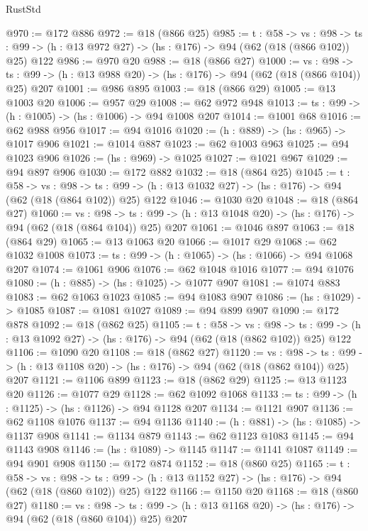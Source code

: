 \begin{lexlean}{RustStd}
\begin{coremodule}
{\begin{coremodule}
{{{{@970 := @172 @886
@972 := @18 (@866 @25)
@985 := {t : @58} ->
  {vs : @98} ->
  {ts : @99} -> (h : @13 @972 @27) -> (hs : @176) -> @94 (@62 (@18 (@866 @102)) @25) @122
@986 := @970 @20
@988 := @18 (@866 @27)
@1000 := {vs : @98} ->
  {ts : @99} -> (h : @13 @988 @20) -> (hs : @176) -> @94 (@62 (@18 (@866 @104)) @25) @207
@1001 := @986 @895
@1003 := @18 (@866 @29)
@1005 := @13 @1003 @20
@1006 := @957 @29
@1008 := @62 @972 @948
@1013 := {ts : @99} -> (h : @1005) -> (hs : @1006) -> @94 @1008 @207
@1014 := @1001 @68
@1016 := @62 @988 @956
@1017 := @94 @1016
@1020 := (h : @889) -> (hs : @965) -> @1017 @906
@1021 := @1014 @887
@1023 := @62 @1003 @963
@1025 := @94 @1023 @906
@1026 := (hs : @969) -> @1025
@1027 := @1021 @967
@1029 := @94 @897 @906
@1030 := @172 @882
@1032 := @18 (@864 @25)
@1045 := {t : @58} ->
  {vs : @98} ->
  {ts : @99} -> (h : @13 @1032 @27) -> (hs : @176) -> @94 (@62 (@18 (@864 @102)) @25) @122
@1046 := @1030 @20
@1048 := @18 (@864 @27)
@1060 := {vs : @98} ->
  {ts : @99} -> (h : @13 @1048 @20) -> (hs : @176) -> @94 (@62 (@18 (@864 @104)) @25) @207
@1061 := @1046 @897
@1063 := @18 (@864 @29)
@1065 := @13 @1063 @20
@1066 := @1017 @29
@1068 := @62 @1032 @1008
@1073 := {ts : @99} -> (h : @1065) -> (hs : @1066) -> @94 @1068 @207
@1074 := @1061 @906
@1076 := @62 @1048 @1016
@1077 := @94 @1076
@1080 := (h : @885) -> (hs : @1025) -> @1077 @907
@1081 := @1074 @883
@1083 := @62 @1063 @1023
@1085 := @94 @1083 @907
@1086 := (hs : @1029) -> @1085
@1087 := @1081 @1027
@1089 := @94 @899 @907
@1090 := @172 @878
@1092 := @18 (@862 @25)
@1105 := {t : @58} ->
  {vs : @98} ->
  {ts : @99} -> (h : @13 @1092 @27) -> (hs : @176) -> @94 (@62 (@18 (@862 @102)) @25) @122
@1106 := @1090 @20
@1108 := @18 (@862 @27)
@1120 := {vs : @98} ->
  {ts : @99} -> (h : @13 @1108 @20) -> (hs : @176) -> @94 (@62 (@18 (@862 @104)) @25) @207
@1121 := @1106 @899
@1123 := @18 (@862 @29)
@1125 := @13 @1123 @20
@1126 := @1077 @29
@1128 := @62 @1092 @1068
@1133 := {ts : @99} -> (h : @1125) -> (hs : @1126) -> @94 @1128 @207
@1134 := @1121 @907
@1136 := @62 @1108 @1076
@1137 := @94 @1136
@1140 := (h : @881) -> (hs : @1085) -> @1137 @908
@1141 := @1134 @879
@1143 := @62 @1123 @1083
@1145 := @94 @1143 @908
@1146 := (hs : @1089) -> @1145
@1147 := @1141 @1087
@1149 := @94 @901 @908
@1150 := @172 @874
@1152 := @18 (@860 @25)
@1165 := {t : @58} ->
  {vs : @98} ->
  {ts : @99} -> (h : @13 @1152 @27) -> (hs : @176) -> @94 (@62 (@18 (@860 @102)) @25) @122
@1166 := @1150 @20
@1168 := @18 (@860 @27)
@1180 := {vs : @98} ->
  {ts : @99} -> (h : @13 @1168 @20) -> (hs : @176) -> @94 (@62 (@18 (@860 @104)) @25) @207
}}}}
\end{coremodule}}
\end{coremodule}
\end{lexlean}
